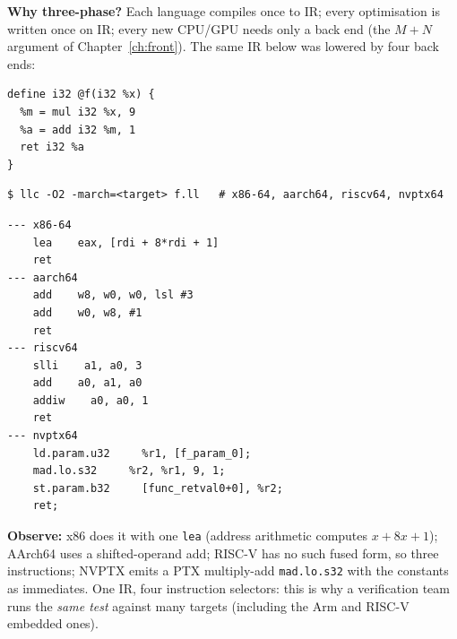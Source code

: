\documentclass[10pt,a4paper,openany,oneside]{report}
\begin{document}
\textbf{Why three-phase?} Each language compiles once to IR; every optimisation is written once on IR; every new CPU/GPU needs only a back end (the $M+N$ argument of Chapter~\ref{ch:front}). The same IR below was lowered by four back ends:
\begin{lstlisting}[language={LLVMIR},title={f.ll: x*9 + 1}]
define i32 @f(i32 %x) {
  %m = mul i32 %x, 9
  %a = add i32 %m, 1
  ret i32 %a
}
\end{lstlisting}
\begin{lstlisting}[style=shcmd]
$ llc -O2 -march=<target> f.ll   # x86-64, aarch64, riscv64, nvptx64
\end{lstlisting}
\begin{lstlisting}[style=out]
--- x86-64
    lea    eax, [rdi + 8*rdi + 1]
    ret
--- aarch64
    add    w8, w0, w0, lsl #3
    add    w0, w8, #1
    ret
--- riscv64
    slli    a1, a0, 3
    add    a0, a1, a0
    addiw    a0, a0, 1
    ret
--- nvptx64
    ld.param.u32     %r1, [f_param_0];
    mad.lo.s32     %r2, %r1, 9, 1;
    st.param.b32     [func_retval0+0], %r2;
    ret;
\end{lstlisting}
\textbf{Observe:} x86 does it with one \texttt{lea} (address arithmetic computes $x+8x+1$); AArch64 uses a shifted-operand add; RISC-V has no such fused form, so three instructions; NVPTX emits a PTX multiply-add \texttt{mad.lo.s32} with the constants as immediates. One IR, four instruction selectors: this is why a verification team runs the \emph{same test} against many targets (including the Arm and RISC-V embedded ones).
\end{document}
